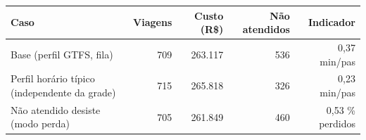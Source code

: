 \begin{tabular}{lrrrr}
\toprule
Caso & Viagens & Custo (R\$) & Não atendidos & Indicador \\
\midrule
Base (perfil GTFS, fila) & 709 & 263.117 & 536 & 0{,}37 min/pas \\
Perfil horário típico (independente da grade) & 715 & 265.818 & 326 & 0{,}23 min/pas \\
Não atendido desiste (modo perda) & 705 & 261.849 & 460 & 0{,}53 \% perdidos \\
\bottomrule
\end{tabular}
